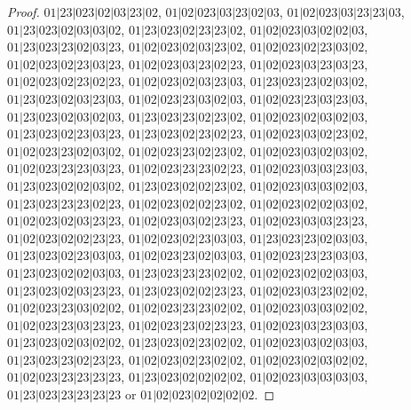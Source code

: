 \documentclass[12pt]{article}
\theoremstyle{plain}
\theoremstyle{definition}
\theoremstyle{remark}
\begin{document}
\begin{proof}
$01|23|023|02|03|23|02$, $01|02|023|03|23|02|03$, $01|02|023|03|23|23|03$, $01|23|023|02|03|03|02$, $01|23|023|02|23|23|02$, $01|02|023|03|02|02|03$, $01|23|023|23|02|03|23$, $01|02|023|02|03|23|02$, $01|02|023|02|23|03|02$, $01|02|023|02|23|03|23$, $01|02|023|03|23|02|23$, $01|02|023|03|23|03|23$, $01|02|023|02|23|02|23$, $01|02|023|02|03|23|03$, $01|23|023|23|02|03|02$, $01|23|023|02|03|23|03$, $01|02|023|23|03|02|03$, $01|02|023|23|03|23|03$, $01|23|023|02|03|02|03$, $01|23|023|23|02|23|02$, $01|02|023|02|03|02|03$, $01|23|023|02|23|03|23$, $01|23|023|02|23|02|23$, $01|02|023|03|02|23|02$, $01|02|023|23|02|03|02$, $01|02|023|23|02|23|02$, $01|02|023|03|02|03|02$, $01|02|023|23|23|03|23$, $01|02|023|23|23|02|23$, $01|02|023|03|03|23|03$, $01|23|023|02|02|03|02$, $01|23|023|02|02|23|02$, $01|02|023|03|03|02|03$, $01|23|023|23|23|02|23$, $01|02|023|02|02|23|02$, $01|02|023|02|02|03|02$, $01|02|023|02|03|23|23$, $01|02|023|03|02|23|23$, $01|02|023|03|03|23|23$, $01|02|023|02|02|23|23$, $01|02|023|02|23|03|03$, $01|23|023|23|02|03|03$, $01|23|023|02|23|03|03$, $01|02|023|23|02|03|03$, $01|02|023|23|23|03|03$, $01|23|023|02|02|03|03$, $01|23|023|23|23|02|02$, $01|02|023|02|02|03|03$, $01|23|023|02|03|23|23$, $01|23|023|02|02|23|23$, $01|02|023|03|23|02|02$, $01|02|023|23|03|02|02$, $01|02|023|23|23|02|02$, $01|02|023|03|03|02|02$, $01|02|023|23|03|23|23$, $01|02|023|23|02|23|23$, $01|02|023|03|23|03|03$, $01|23|023|02|03|02|02$, $01|23|023|02|23|02|02$, $01|02|023|03|02|03|03$, $01|23|023|23|02|23|23$, $01|02|023|02|23|02|02$, $01|02|023|02|03|02|02$, $01|02|023|23|23|23|23$, $01|23|023|02|02|02|02$, $01|02|023|03|03|03|03$, $01|23|023|23|23|23|23$ or $01|02|023|02|02|02|02$.
	

\end{proof}
\end{document}

